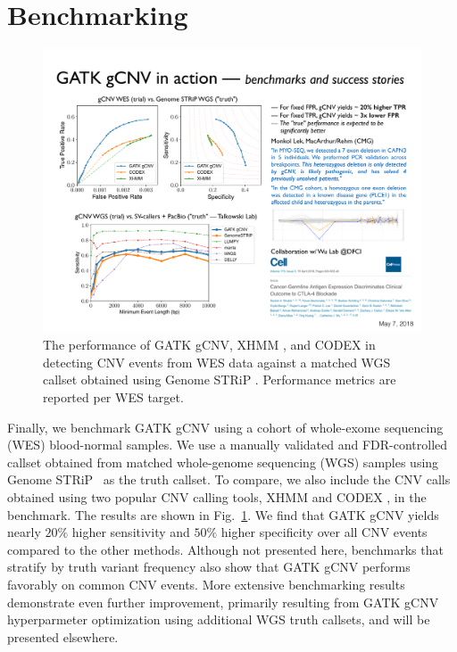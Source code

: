 \documentclass[sigplan]{acmart}\settopmatter{printfolios=true,printccs=false,printacmref=false}
\begin{document}
\section{Benchmarking}\label{sec:bench}
\begin{figure}
\includegraphics[width=\columnwidth]{figures/germline-cnv-caller-model/benchmark.pdf}
\caption{The performance of GATK gCNV, XHMM \cite{fromer_discovery_2012}, and CODEX \cite{jiang_codex:_2015} in detecting CNV events from WES data against a matched WGS callset obtained using Genome STRiP \cite{handsaker_large_2015}.  Performance metrics are reported per WES target.}  
\label{fig:benchmark}
\end{figure}
Finally, we benchmark GATK gCNV using a cohort of whole-exome sequencing (WES) blood-normal samples. We use a manually validated and FDR-controlled callset obtained from matched whole-genome sequencing (WGS) samples using Genome STRiP~\cite{handsaker_large_2015} as the truth callset. To compare, we also include the CNV calls obtained using two popular CNV calling tools, XHMM \cite{fromer_discovery_2012} and CODEX \cite{jiang_codex:_2015}, in the benchmark. The results are shown in Fig.~\ref{sec:bench}. We find that GATK gCNV yields nearly $20\%$ higher sensitivity and $50\%$ higher specificity over all CNV events compared to the other methods.  Although not presented here, benchmarks that stratify by truth variant frequency also show that GATK gCNV performs favorably on common CNV events. More extensive benchmarking results demonstrate even further improvement, primarily resulting from GATK gCNV hyperparmeter optimization using additional WGS truth callsets, and will be presented elsewhere.


\end{document}

